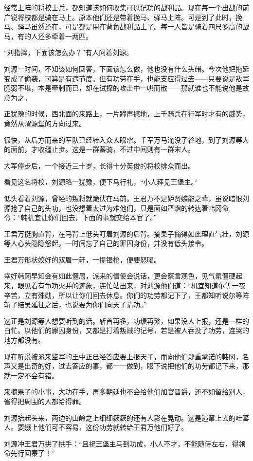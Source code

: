 经常上阵的将校士兵，都知道该如何收集可以记功的战利品。现在每一个出战的前广锐将校都是骑在马上。原本他们还是带着挽马、驿马上阵。可是到了此时，挽马、驿马虽然还在，可是都是用在背负战利品上了。每一人皆是骑着四尺多高的战马，有的人还多牵着一两匹。

“刘指挥，下面该怎么办？”有人问着刘源。

刘源一时间，不知该如何回答，下面该怎么做，他也没有什么头绪。今次他把拖延变成了偷袭，可算是有违节度。但有功劳在手，也能支应得过去——只要说是敌军脆弱不堪，本是牵制而已，却在试探的攻击中一哄而散——那就谁也不能说他是故意为之。

正犹豫的时候，西北面的来路上，一片蹄声撼地，上千骑兵在行军时才有的威势，竟然从渭源堡的方向过来。

很快，从后方而来的军队已经转入众人眼帘。千军万马淹没了谷地，到了刘源等人的面前，才收缰止步。这是一群蕃骑，不过中间则有一群宋人。

大军停步后，一个接近三十岁，长得十分英俊的将校排众而出。

看见这名将校，刘源略一犹豫，便下马行礼，“小人拜见王堡主。”

低头看着刘源，曾经的叛将就跪伏在马前。王君万不是妒贤嫉能之辈，虽说暗恨刘源抢了自己的头功，也没想着太过为难他们，只是面如严霜的转达着韩冈命令：“韩机宜让你们回去，下面的事就交给本官了。”

王君万挺胸直背，在马背上低头盯着刘源的后背。摘果子摘得如此理直气壮，刘源等人心头隐隐怒起，一时间忘了自己的罪囚身份，并没有低头接令。

王君万形状姣好的双眉一轩，一提银枪，便要怒喝。

幸好韩冈早知会有如此僵局，派来的信使会说话，更会察言观色，见气氛僵硬起来，眼见着有争功火并的迹象，连忙站出来，对刘源他们道：“机宜知道尔等一夜辛苦，立有殊勋，所以让你们回去休息。你们的功劳都记下了，王都知听说尔等阵斩了结吴延征之后，也说要为你们向天子请功。”

这正是刘源等人想要听到的话。斩首再多，功绩再繁，如果没人上报，还是一样的白忙。以他们的罪囚身份，又都是打着叛贼的记号，若是被人吞没了功劳，连哭的地方都没有。

现在听说被派来监军的王中正已经答应要上报天子，而向他们郑重承诺的韩冈，名声又是出奇的好，过去答应的事，都一一做到，眼下说把他们的功劳都记下来，那就一定不会有错。

来摘果子的小事，大功在手，再多朝廷也不会给他们加官晋爵，还不如留给别人，省得把周围的人都给得罪。

刘源抬起头来，两边的山岭之上细细簌簌的还有人影在晃动。这是逃窜上去的吐蕃人。要缀上他们可不容易，这份功劳就转给王君万他们好了。

刘源冲王君万拱了拱手：“且祝王堡主马到功成，小人不才，不能随侍左右，得领命先行回寨了！”

